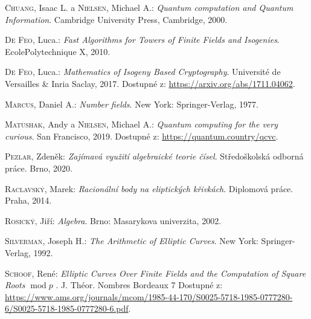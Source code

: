 \documentclass [12pt]{report}
\begin{document}



\begin{thebibliography}{97}

\textsc{Chuang}, Isaac L. a \textsc{Nielsen}, Michael A.: \textit{Quantum computation and Quantum Information}. Cambridge University Press, Cambridge, 2000. 


\textsc{De Feo}, Luca.: \textit{Fast Algorithms for Towers of Finite Fields and Isogenies}. EcolePolytechnique X, 2010. 

\textsc{De Feo}, Luca.: \textit{Mathematics of Isogeny Based Cryptography}. Université de Versailles \& Inria Saclay, 2017. Dostupné z: \url{https://arxiv.org/abs/1711.04062}.

\textsc{Marcus}, Daniel A.: \textit{Number fields}. New York: Springer-Verlag, 1977.

\textsc{Matushak}, Andy a \textsc{Nielsen}, Michael A.: \textit{ Quantum computing for the very curious}. San Francisco, 2019. Dostupné z: \url{https://quantum.country/qcvc}.

\textsc{Pezlar}, Zdeněk: \textit{Zajímavá využití algebraické teorie čísel}. Středoškolská odborná práce. Brno, 2020.

\textsc{Raclavský}, Marek: \textit{Racionální body na eliptických křivkách}. Diplomová práce. Praha, 2014.

\textsc{Rosický}, Jiří: \textit{Algebra}. Brno: Masarykova univerzita, 2002.

\textsc{Silverman}, Joseph H.: \textit{The Arithmetic of Elliptic Curves}. New York: Springer-Verlag, 1992. 

\textsc{Schoof}, René: \textit{Elliptic Curves Over Finite Fields and the Computation of Square Roots $\operatorname{mod} p$ }. J. Théor. Nombres Bordeaux 7 Dostupné z: \url{https://www.ams.org/journals/mcom/1985-44-170/S0025-5718-1985-0777280-6/S0025-5718-1985-0777280-6.pdf}.


\end{thebibliography}
\end{document}
